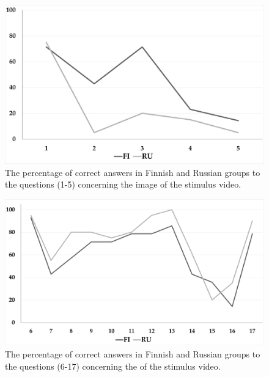 \documentclass[output=paper]{langsci/langscibook}
\begin{document}
\begin{figure}[h]
 \includegraphics[width=\textwidth]{figures/Lang1.png}

%  
% 
% 
% 
% 

 \caption{The percentage of correct answers in Finnish and Russian groups to the questions (1-5) concerning the image of the stimulus video.}
 \label{lang:fig:1}
\end{figure} 

\begin{figure}[h]
 
 \includegraphics[width=\textwidth]{figures/Lang2.png}
 \caption{The percentage of correct answers in Finnish and Russian groups to the questions (6-17) concerning the  of the stimulus video.}
 \label{lang:fig:2}
\end{figure}
\end{document}
